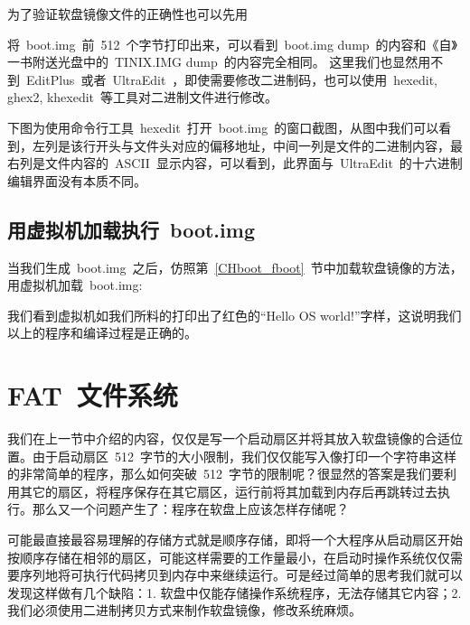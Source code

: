 为了验证软盘镜像文件的正确性也可以先用
将~boot.img~前~512~个字节打印出来，可以看到~boot.img dump~的内容和《自》一书附送光盘中的~TINIX.IMG dump~的内容完全相同。
这里我们也显然用不到~EditPlus~或者~UltraEdit~，即使需要修改二进制码，也可以使用~hexedit, ghex2, khexedit~等工具对二进制文件进行修改。

下图为使用命令行工具~hexedit~打开~boot.img~的窗口截图，从图中我们可以看到，左列是该行开头与文件头对应的偏移地址，中间一列是文件的二进制内容，最右列是文件内容的~ASCII~显示内容，可以看到，此界面与~UltraEdit~的十六进制编辑界面没有本质不同。



\subsection{用虚拟机加载执行~boot.img}

当我们生成~boot.img~之后，仿照第~\ref{CHboot_fboot}~节中加载软盘镜像的方法，用虚拟机加载~boot.img:\\


我们看到虚拟机如我们所料的打印出了红色的“Hello OS world!”字样，这说明我们以上的程序和编译过程是正确的。

\section{FAT~文件系统}

我们在上一节中介绍的内容，仅仅是写一个启动扇区并将其放入软盘镜像的合适位置。由于启动扇区~512~字节的大小限制，我们仅仅能写入像打印一个字符串这样的非常简单的程序，那么如何突破~512~字节的限制呢？很显然的答案是我们要利用其它的扇区，将程序保存在其它扇区，运行前将其加载到内存后再跳转过去执行。那么又一个问题产生了：程序在软盘上应该怎样存储呢？

可能最直接最容易理解的存储方式就是顺序存储，即将一个大程序从启动扇区开始按顺序存储在相邻的扇区，可能这样需要的工作量最小，在启动时操作系统仅仅需要序列地将可执行代码拷贝到内存中来继续运行。可是经过简单的思考我们就可以发现这样做有几个缺陷：1. 软盘中仅能存储操作系统程序，无法存储其它内容；2. 我们必须使用二进制拷贝方式来制作软盘镜像，修改系统麻烦。

